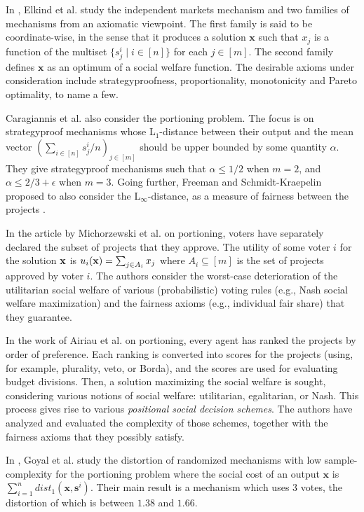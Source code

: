 In \cite{EST23}, Elkind et al. study the independent markets mechanism and two families of mechanisms from an axiomatic viewpoint. The first family is said to be coordinate-wise, in the sense that it produces a solution $\textbf{x}$ such that $x_j$ is a function of the multiset $\{s^i_j \mid i \in [n]\}$ for each $j \in [m]$. The second family defines $\textbf{x}$ as an optimum of a social welfare function. The desirable axioms under consideration include strategyproofness, proportionality, monotonicity and Pareto optimality, to name a few.  

Caragiannis et al. \cite{CCP24} also consider the portioning problem. The focus is on strategyproof mechanisms whose L$_1$-distance between their output and the mean vector $(\sum_{i\in [n]}s^i_j/n)_{j \in [m]}$ should be upper bounded by some quantity $\alpha$. They give strategyproof mechanisms such that $\alpha \leq 1/2$ when $m=2$, and $\alpha \leq 2/3+\epsilon$ when $m=3$. Going further, Freeman and Schmidt{-}Kraepelin \cite{FS24} proposed to also consider the L$_\infty$-distance, as a measure of fairness between the projects \cite{FS24}.


In the article by Michorzewski et al. \cite{MPS20} on portioning, 
voters have separately declared the subset of projects that they approve. The utility of some voter $i$ for the solution ${\bf x}$ is $u_i({\bf x})=\sum_{j\in A_i} x_j$ where $A_i \subseteq [m]$ is the set of projects approved by voter $i$. The authors consider the worst-case deterioration of the utilitarian social welfare of various (probabilistic) voting rules (e.g., Nash social welfare maximization) and the fairness axioms (e.g., individual fair share) that they guarantee. 



In the work of Airiau et al. \cite{AACKLP23} on portioning, every agent  has ranked the projects by order of preference. Each ranking is converted into scores for the projects (using, for example, plurality, veto, or Borda), and the scores are used for evaluating budget divisions. Then, a solution maximizing the social welfare is sought, considering  various notions of social welfare: utilitarian, egalitarian, or Nash. This process gives rise to various {\em positional social decision schemes}. The authors have analyzed and evaluated the %
complexity of those schemes, together with the fairness axioms that they possibly satisfy. %

In \cite{GoyalSSG23}, Goyal et al. study the distortion of randomized mechanisms with low sample-complexity 
for the portioning problem where the social cost of an output $\textbf{x}$ is $\sum_{i=1}^n dist_1(\textbf{x},\textbf{s}^i)$. Their main result is a mechanism which uses 3 votes, the distortion of which is between $1.38$ and $1.66$.    



